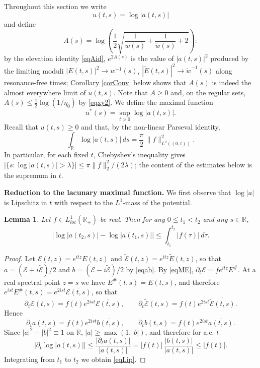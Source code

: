 \documentclass[11pt,twoside,reqno]{amsart}
\def\ti{\tilde}
\def\to{\rightarrow}
\def\pa{\partial}
\def\R{{\mathbb R}}
\def\EE{{\mathcal E}}
\theoremstyle{plain}
\newtheorem{lemma}{Lemma}
\numberwithin{equation}{section}
\begin{document}
Throughout this section we write
$$u(t,s)=\log|a(t,s)|$$
and define
$$A(s) = \log\left(\frac{1}{2} \sqrt{\frac{1}{w(s)} + \frac{1}{\tilde{w}(s)} + 2} \right):$$
by the elevation identity \eqref{eqAid}, $e^{2A(s)}$ is the value of $|a(t,s)|^2$ produced by the limiting moduli $|E(t,s)|^2\to w^{-1}(s)$, $|\ti E(t,s)|^2\to\ti w^{-1}(s)$ along resonance-free times; Corollary \ref{corConv} below shows that $A(s)$ is indeed the almost everywhere limit of $u(t,s)$. Note that $A\geq0$ and, on the regular sets, $A(s)\leq\frac12\log(1/\eta_0)$ by \eqref{eqxy2}. We define the maximal function
$$u^*(s)=\sup_{t>0}\log|a(t,s)| .$$
Recall that $u(t,s)\geq 0$ and that, by the non-linear Parseval identity,
\begin{equation}\int_\R \log|a(t,s)|\,ds=\frac\pi2\,\|f\|^2_{L^2((0,t))}.\label{eqPars}\end{equation}
In particular, for each fixed $t$, Chebyshev's inequality gives $|\{s:\log|a(t,s)|>\lambda\}|\leq \pi\|f\|_2^2/(2\lambda)$; the content of the estimates below is the supremum in $t$.

{\bf Reduction to the lacunary maximal function.} We first observe that $\log|a|$ is Lipschitz in $t$ with respect to the $L^1$-mass of the potential.

\begin{lemma}\label{lemLip} Let $f\in L^1_{loc}(\R_+)$ be real. Then for any $0\leq t_1<t_2$ and any $s\in\R$,
\begin{equation}\big|\log|a(t_2,s)|-\log|a(t_1,s)|\big|\leq \int_{t_1}^{t_2}|f(\tau)|\,d\tau.\label{eqLip}\end{equation}
\end{lemma}

\begin{proof} Let $\EE(t,z)=e^{itz}E(t,z)$ and $\ti\EE(t,z)=e^{itz}\ti E(t,z)$, so that $a=(\EE+i\ti\EE)/2$ and $b=(\EE-i\ti\EE)/2$ by \eqref{eqab}. By \eqref{eqME}, $\pa_t\EE=f e^{itz}E^\#$. At a real spectral point $z=s$ we have $E^\#(t,s)=\overline{E(t,s)}$, and therefore $e^{ist}E^\#(t,s)=e^{2ist}\overline{\EE(t,s)}$, so that
$$\pa_t\EE(t,s)=f(t)e^{2ist}\overline{\EE(t,s)},\qquad \pa_t\ti\EE(t,s)=f(t)e^{2ist}\overline{\ti\EE(t,s)}.$$
Hence
$$\pa_t a(t,s)=f(t)e^{2ist}\overline{b(t,s)},\qquad \pa_t b(t,s)=f(t)e^{2ist}\overline{a(t,s)}.$$
Since $|a|^2-|b|^2\equiv 1$ on $\R$, $|a|\geq\max(1,|b|)$, and therefore for a.e. $t$
$$\big|\pa_t \log|a(t,s)|\big|\leq \frac{|\pa_t a(t,s)|}{|a(t,s)|}= |f(t)|\,\frac{|b(t,s)|}{|a(t,s)|}\leq |f(t)|.$$
Integrating from $t_1$ to $t_2$ we obtain \eqref{eqLip}.
\end{proof}
\end{document}
